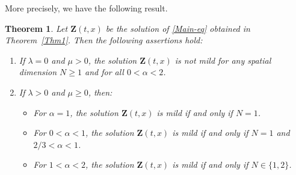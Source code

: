 \documentclass[12pt, reqno]{amsart}
\newcommand{\bz}{\ensuremath{\mathbf{Z}}}
\newtheorem{theorem}{Theorem}[section]
\begin{document}
More precisely, we have the following result.
\begin{theorem}
\label{Thm2}
Let $\bz(t,x)$ be the solution of \eqref{Main-eq} obtained in Theorem~\ref{Thm1}.  
Then the following assertions hold:
\begin{enumerate}[label=(\roman*)]
    \item If $\lambda = 0$ and $\mu>0$, the solution $\bz(t,x)$ is not mild for any spatial dimension $N \ge 1$ and for all $0 < \alpha < 2$.
    
    \item If $\lambda > 0$ and $\mu\geq 0$, then:
    \begin{itemize}
        \item[(a)] For $\alpha = 1$, the solution $\bz(t,x)$ is mild if and only if $N = 1$.
        \item[(b)] For $0 < \alpha < 1$, the solution $\bz(t,x)$ is  mild if and only if  $N=1$ and $2/3<\alpha<1$.
        \item[(c)] For $1 < \alpha < 2$, the solution $\bz(t,x)$ is mild if and only if $N \in \{1,2\}$.
    \end{itemize}
\end{enumerate}
\end{theorem}
\end{document}

